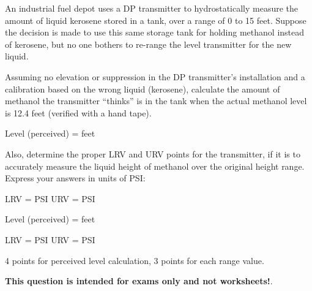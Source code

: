 

An industrial fuel depot uses a DP transmitter to hydrostatically measure the amount of liquid kerosene stored in a tank, over a range of 0 to 15 feet.  Suppose the decision is made to use this same storage tank for holding methanol instead of kerosene, but no one bothers to re-range the level transmitter for the new liquid.

Assuming no elevation or suppression in the DP transmitter's installation and a calibration based on the wrong liquid (kerosene), calculate the amount of methanol the transmitter ``thinks'' is in the tank when the actual methanol level is 12.4 feet (verified with a hand tape).

\vskip 10pt

Level (perceived) = \underbar{\hskip 50pt} feet

\vskip 10pt

Also, determine the proper LRV and URV points for the transmitter, if it is to accurately measure the liquid height of methanol over the original height range.  Express your answers in units of PSI:

\vskip 10pt

LRV = \underbar{\hskip 50pt} PSI \hskip 30pt URV = \underbar{\hskip 50pt} PSI







Level (perceived) =  feet

\vskip 10pt

LRV =  PSI \hskip 30pt URV =  PSI

\vskip 10pt

4 points for perceived level calculation, 3 points for each range value.







{\bf This question is intended for exams only and not worksheets!}.




